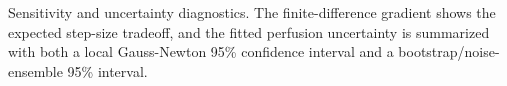 \caption{Sensitivity and uncertainty diagnostics. The finite-difference gradient shows the expected step-size tradeoff, and the fitted perfusion uncertainty is summarized with both a local Gauss-Newton 95\% confidence interval and a bootstrap/noise-ensemble 95\% interval.}\label{fig:sensitivity-uq-diagnostics}
